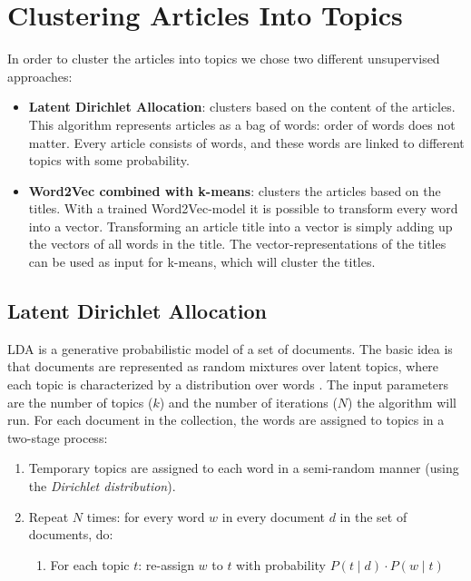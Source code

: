\section{Clustering Articles Into Topics}
\label{sec:topic_detection}

In order to cluster the articles into topics we chose two different unsupervised approaches: 

\begin{itemize}
\item \textbf{Latent Dirichlet Allocation}: clusters based on the content of the articles. This algorithm represents articles as a bag of words: order of words does not matter. Every article consists of words, and these words are linked to different topics with some probability.
\item \textbf{Word2Vec combined with k-means}: clusters the articles based on the titles. With a trained Word2Vec-model it is possible to transform every word into a vector. Transforming an article title into a vector is simply adding up the vectors of all words in the title. 
The vector-representations of the titles can be used as input for k-means, which will cluster the titles.
\end{itemize}

\subsection{Latent Dirichlet Allocation}
LDA is a generative probabilistic model of a set of documents. The basic idea is that documents are represented as random mixtures over latent topics, where each topic is characterized by a distribution over words \cite{blei2003latent}. The input parameters are the number of topics ($k$) and the number of iterations ($N$) the algorithm will run. For each document in the collection, the words are assigned to topics in a two-stage process:

\begin{enumerate}
\item Temporary topics are assigned to each word in a semi-random manner (using the \textit{Dirichlet distribution}).
\item Repeat $N$ times: for every word $w$ in every document $d$ in the set of documents, do:
	\begin{enumerate}
		\item For each topic $t$: re-assign $w$ to $t$ with probability $P(t \mid d) \cdot P(w \mid t)$
	\end{enumerate}
\end{enumerate}

